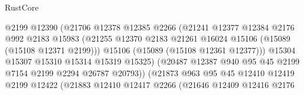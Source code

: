 \begin{lexlean}{RustCore}
\begin{coremodule}
                                      @2199
                                      @12390
                                      (@21706
                                        @12378
                                        @12385
                                        @2266
                                        (@21241
                                          @12377
                                          @12384
                                          @2176
                                          @992
                                          @2183
                                          @15983
                                          (@21255
                                            @12370
                                            @2183
                                            @21261
                                            @16024
                                            @15106
                                            (@15089 (@15108 @12371 @2199)))
                                          @15106
                                          (@15089 (@15108 @12361 @12377)))
                                        @15304
                                        @15307
                                        @15310
                                        @15314
                                        @15319
                                        @15325)
                                      (@20487
                                        @12387
                                        @940
                                        @95
                                        @45
                                        @2199
                                        @7154
                                        @2199
                                        @2294
                                        @26787
                                        @20793))
                                    (@21873
                                      @963
                                      @95
                                      @45
                                      @12410
                                      @12419
                                      @2199
                                      @12422
                                      (@21883
                                        @12410
                                        @12417
                                        @2266
                                        (@21646
                                          @12409
                                          @12416
                                          @2176

\end{coremodule}
\end{lexlean}
